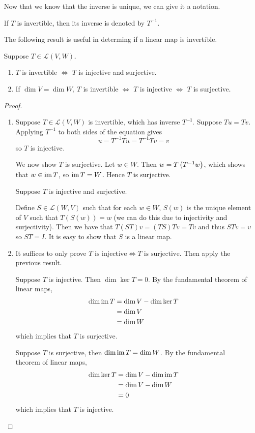 Now that we know that the inverse is unique, we can give it a notation.

\begin{notation}
If $T$ is invertible, then its inverse is denoted by $T^{-1}$.
\end{notation}

The following result is useful in determing if a linear map is invertible.

\begin{lemma}\label{lemma:invertibility-criterion}
Suppose $T\in\mathcal{L}(V,W)$.
\begin{enumerate}[label=(\roman*)]
\item $T$ is invertible $\iff$ $T$ is injective and surjective.
\item If $\dim V=\dim W$, $T$ is invertible $\iff$ $T$ is injective $\iff$ $T$ is surjective.
\end{enumerate}
\end{lemma}

\begin{proof} \
\begin{enumerate}[label=(\roman*)]
\item \fbox{$\implies$} Suppose $T\in\mathcal{L}(V,W)$ is invertible, which has inverse $T^{-1}$. Suppose $Tu=Tv$. Applying $T^{-1}$ to both sides of the equation gives
\[u=T^{-1}Tu=T^{-1}Tv=v\]
so $T$ is injective.

We now show $T$ is surjective. Let $w\in W$. Then $w=T\left(T^{-1}w\right)$, which shows that $w\in\operatorname{im} T$, so $\operatorname{im} T=W$. Hence $T$ is surjective.

\fbox{$\impliedby$} Suppose $T$ is injective and surjective.

Define $S\in\mathcal{L}(W,V)$ such that for each $w\in W$, $S(w)$ is the unique element of $V$ such that $T(S(w))=w$ (we can do this due to injectivity and surjectivity). Then we have that $T(ST)v=(TS)Tv=Tv$ and thus $STv=v$ so $ST=I$. It is easy to show that $S$ is a linear map.

\item It suffices to only prove $T\text{ is injective}\iff T\text{ is surjective}$. Then apply the previous result.

\fbox{$\implies$} Suppose $T$ is injective. Then $\dim\ker T=0$. By the fundamental theorem of linear maps, 
\begin{align*}
\dim\operatorname{im} T&=\dim V-\dim\ker T\\
&=\dim V\\
&=\dim W
\end{align*}
which implies that $T$ is surjective.

\fbox{$\impliedby$} Suppose $T$ is surjective, then $\dim\operatorname{im} T=\dim W$. By the fundamental theorem of linear maps,
\begin{align*}
\dim\ker T&=\dim V-\dim\operatorname{im} T\\
&=\dim V-\dim W\\
&=0
\end{align*}
which implies that $T$ is injective.
\end{enumerate}
\end{proof}

